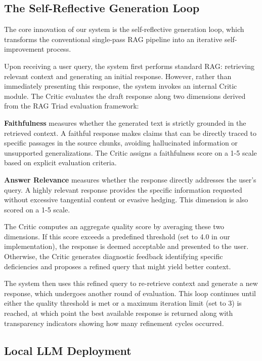 \documentclass[11pt,a4paper]{article}
\begin{document}
\subsection{The Self-Reflective Generation Loop}

The core innovation of our system is the self-reflective generation loop, which transforms the conventional single-pass RAG pipeline into an iterative self-improvement process.

Upon receiving a user query, the system first performs standard RAG: retrieving relevant context and generating an initial response. However, rather than immediately presenting this response, the system invokes an internal Critic module. The Critic evaluates the draft response along two dimensions derived from the RAG Triad evaluation framework:

\textbf{Faithfulness} measures whether the generated text is strictly grounded in the retrieved context. A faithful response makes claims that can be directly traced to specific passages in the source chunks, avoiding hallucinated information or unsupported generalizations. The Critic assigns a faithfulness score on a 1-5 scale based on explicit evaluation criteria.

\textbf{Answer Relevance} measures whether the response directly addresses the user's query. A highly relevant response provides the specific information requested without excessive tangential content or evasive hedging. This dimension is also scored on a 1-5 scale.

The Critic computes an aggregate quality score by averaging these two dimensions. If this score exceeds a predefined threshold (set to 4.0 in our implementation), the response is deemed acceptable and presented to the user. Otherwise, the Critic generates diagnostic feedback identifying specific deficiencies and proposes a refined query that might yield better context.

The system then uses this refined query to re-retrieve context and generate a new response, which undergoes another round of evaluation. This loop continues until either the quality threshold is met or a maximum iteration limit (set to 3) is reached, at which point the best available response is returned along with transparency indicators showing how many refinement cycles occurred.

\subsection{Local LLM Deployment}
\end{document}
